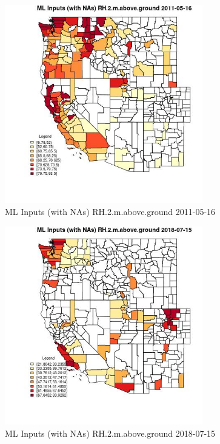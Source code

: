 \begin{figure} 
\centering  
\includegraphics[width=0.77\textwidth]{Code_Outputs/Report_ML_input_PM25_Step4_part_e_de_duplicated_aves_compiled_2019-05-20wNAs_CountyRH2mabovegroundMean2011-05-16.jpg} 
\caption{\label{fig:Report_ML_input_PM25_Step4_part_e_de_duplicated_aves_compiled_2019-05-20wNAsCountyRH2mabovegroundMean2011-05-16}ML Inputs (with NAs) RH.2.m.above.ground 2011-05-16} 
\end{figure} 
 

\begin{figure} 
\centering  
\includegraphics[width=0.77\textwidth]{Code_Outputs/Report_ML_input_PM25_Step4_part_e_de_duplicated_aves_compiled_2019-05-20wNAs_CountyRH2mabovegroundMean2018-07-15.jpg} 
\caption{\label{fig:Report_ML_input_PM25_Step4_part_e_de_duplicated_aves_compiled_2019-05-20wNAsCountyRH2mabovegroundMean2018-07-15}ML Inputs (with NAs) RH.2.m.above.ground 2018-07-15} 
\end{figure} 
 

